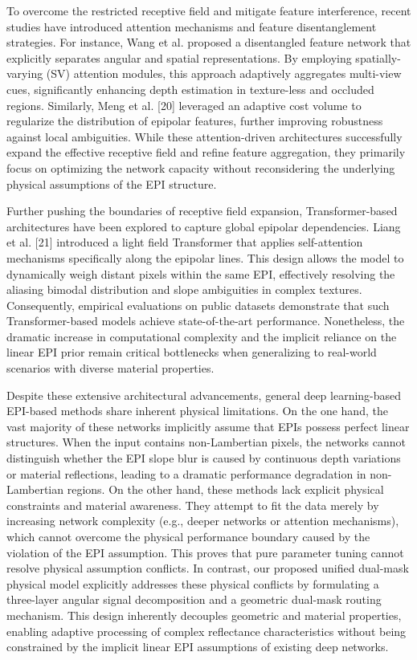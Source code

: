 To overcome the restricted receptive field and mitigate feature interference, recent studies have introduced attention mechanisms and feature disentanglement strategies. For instance, Wang et al. proposed a disentangled feature network that explicitly separates angular and spatial representations. By employing spatially-varying (SV) attention modules, this approach adaptively aggregates multi-view cues, significantly enhancing depth estimation in texture-less and occluded regions. Similarly, Meng et al. [20] leveraged an adaptive cost volume to regularize the distribution of epipolar features, further improving robustness against local ambiguities. While these attention-driven architectures successfully expand the effective receptive field and refine feature aggregation, they primarily focus on optimizing the network capacity without reconsidering the underlying physical assumptions of the EPI structure.

Further pushing the boundaries of receptive field expansion, Transformer-based architectures have been explored to capture global epipolar dependencies. Liang et al. [21] introduced a light field Transformer that applies self-attention mechanisms specifically along the epipolar lines. This design allows the model to dynamically weigh distant pixels within the same EPI, effectively resolving the aliasing bimodal distribution and slope ambiguities in complex textures. Consequently, empirical evaluations on public datasets demonstrate that such Transformer-based models achieve state-of-the-art performance. Nonetheless, the dramatic increase in computational complexity and the implicit reliance on the linear EPI prior remain critical bottlenecks when generalizing to real-world scenarios with diverse material properties.

Despite these extensive architectural advancements, general deep learning-based EPI-based methods share inherent physical limitations. On the one hand, the vast majority of these networks implicitly assume that EPIs possess perfect linear structures. When the input contains non-Lambertian pixels, the networks cannot distinguish whether the EPI slope blur is caused by continuous depth variations or material reflections, leading to a dramatic performance degradation in non-Lambertian regions. On the other hand, these methods lack explicit physical constraints and material awareness. They attempt to fit the data merely by increasing network complexity (e.g., deeper networks or attention mechanisms), which cannot overcome the physical performance boundary caused by the violation of the EPI assumption. This proves that pure parameter tuning cannot resolve physical assumption conflicts. In contrast, our proposed unified dual-mask physical model explicitly addresses these physical conflicts by formulating a three-layer angular signal decomposition and a geometric dual-mask routing mechanism. This design inherently decouples geometric and material properties, enabling adaptive processing of complex reflectance characteristics without being constrained by the implicit linear EPI assumptions of existing deep networks.

